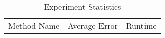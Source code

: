 
 \begin{table}[H] 
 \centering 
 \begin{tabular}{c|c|c} 
  Method Name & Average Error & Runtime\\
 \end{tabular}%
 \caption{Experiment Statistics} 
 \label{tab: stat}%
 \end{table}%
 